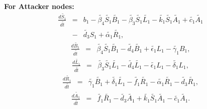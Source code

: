 \documentclass[conference]{IEEEtran}
\begin{document}
\textbf{For Attacker nodes:}\\
\begingroup
\everymath{\scriptstyle}
\scriptsize
\begin{eqnarray}
\frac{d\tilde{S_1}}{d\tilde{t}} &=& b_1-\tilde{\beta_4}\tilde{S_1}\tilde{B_1} -\tilde{\beta_3} \tilde{S_1}\tilde{L_1}-\tilde{k_1} \tilde{S_1}\tilde{A_1}+\tilde{c_1}\tilde{A_1} \nonumber\\
&-& \tilde{d_3}S_1+\tilde{\alpha_1}\tilde{R_1},
\end{eqnarray}
\endgroup
\begingroup
\everymath{\scriptstyle}
\scriptsize
\begin{eqnarray}
\frac{d\tilde{B_1}}{d\tilde{t}} &=& \tilde{\beta_4}\tilde{S_1}\tilde{B_1}-\tilde{d_4}\tilde{B_1}+\tilde{\epsilon_1}L_1-\tilde{\gamma_1}{B_1},
\end{eqnarray}
\endgroup
\begingroup
\everymath{\scriptstyle}
\scriptsize
\begingroup
\everymath{\scriptstyle}
\scriptsize
\begin{eqnarray}
\frac{d\tilde{L_1}}{d\tilde{t}} &=& \tilde{\beta_3}\tilde{S_1}\tilde{L_1}-\tilde{d_4}\tilde{L_1}-\tilde{\epsilon_1}L_1-\tilde{\delta_1}{L_1},
\end{eqnarray}
\endgroup
\begingroup
\everymath{\scriptstyle}
\scriptsize
\begin{eqnarray}
\frac{d\tilde{R_1}}{d\tilde{t}} &=& \tilde{\gamma_1} \tilde{B_1} + \tilde{\delta_1}\tilde{L_1}-\tilde{f_1}\tilde{R_1}-\tilde{\alpha_1} \tilde{R_1}-\tilde{d_3}\tilde{R_1},
\end{eqnarray}
\endgroup
\begingroup
\everymath{\scriptstyle}
\scriptsize
\begin{eqnarray}
\frac{d\tilde{A_1}}{d\tilde{t}} &=& \tilde{f_1}\tilde{R_1}-\tilde{d_3}\tilde{A_1}+\tilde{k_1}\tilde{S_1}\tilde{A_1}-\tilde{c_1}\tilde{A_1}.
\end{eqnarray}
\endgroup
\end{document}

